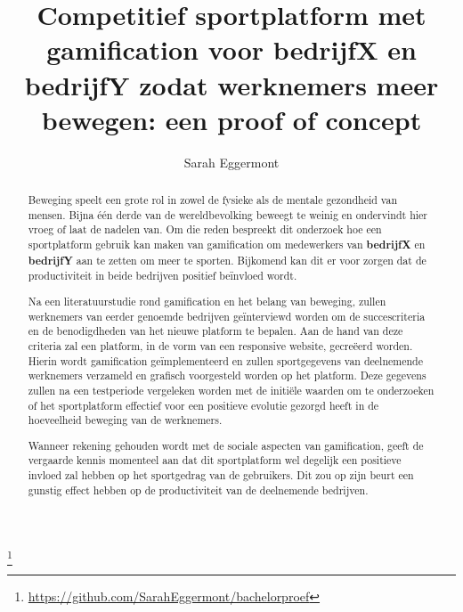 \documentclass{hogent-article}
\title{Competitief sportplatform met gamification voor \textbf{bedrijfX} en \textbf{bedrijfY} zodat werknemers meer bewegen: een proof of concept}
\author{Sarah Eggermont}
\newcommand\blfootnote[1]{%
    \begingroup
    \renewcommand\thefootnote{}\footnote{#1}%
    \addtocounter{footnote}{-1}%
    \endgroup
}
\begin{document}
\begin{abstract}

Beweging speelt een grote rol in zowel de fysieke als de mentale gezondheid van mensen. Bijna één derde van de wereldbevolking beweegt te weinig en ondervindt hier vroeg of laat de nadelen van. Om die reden bespreekt dit onderzoek hoe een sportplatform gebruik kan maken van gamification om medewerkers van \textbf{bedrijfX} en \textbf{bedrijfY} aan te zetten om meer te sporten. Bijkomend kan dit er voor zorgen dat de productiviteit in beide bedrijven positief beïnvloed wordt.

Na een literatuurstudie rond gamification en het belang van beweging, zullen werknemers van eerder genoemde bedrijven geïnterviewd worden om de succescriteria en de benodigdheden van het nieuwe platform te bepalen. Aan de hand van deze criteria zal een platform, in de vorm van een responsive website, gecreëerd worden. Hierin wordt gamification geïmplementeerd en zullen sportgegevens van deelnemende werknemers verzameld en grafisch voorgesteld worden op het platform. Deze gegevens zullen na een testperiode vergeleken worden met de initiële waarden om te onderzoeken of het sportplatform effectief voor een positieve evolutie gezorgd heeft in de hoeveelheid beweging van de werknemers.

Wanneer rekening gehouden wordt met de sociale aspecten van gamification, geeft de vergaarde kennis momenteel aan dat dit sportplatform wel degelijk een positieve invloed zal hebben op het sportgedrag van de gebruikers. Dit zou op zijn beurt een gunstig effect hebben op de productiviteit van de deelnemende bedrijven.

\end{abstract}

\tableofcontents



\printbibliography[heading=bibintoc]

\blfootnote{\href{https://github.com/SarahEggermont/bachelorproef}{https://github.com/SarahEggermont/bachelorproef}}
\end{document}
